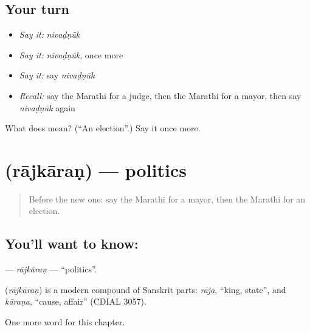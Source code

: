 \subsection*{Your turn}
\begin{itemize}
\raggedright
  \item \emph{Say it:} \emph{nivaḍṇūk}
  \item \emph{Say it:} \emph{nivaḍṇūk}, once more
  \item \emph{Say it:} say \emph{nivaḍṇūk}
  \item \emph{Recall:} say the Marathi for a judge, then the Marathi for a mayor, then say \emph{nivaḍṇūk} again
\end{itemize}

\begin{tcolorbox}[breakable,colback=teal!4,colframe=teal!35!black,title={Before you move on}]
What does  mean? (\textquotedblleft{}An election\textquotedblright{}.) Say it once more.
\end{tcolorbox}
\section[\texorpdfstring{\mr{राजकारण} (rājkāraṇ)}{राजकारण (rājkāraṇ)}]{ (rājkāraṇ) — politics}

\label{lesson:MR-C179-rajkaran}



\begin{quote}
Before the new one: say the Marathi for a mayor, then the Marathi for an election.
\end{quote}

\subsection*{You'll want to know: }
\textbf{} — \emph{rājkāraṇ} — \textquotedblleft{}politics\textquotedblright{}.

\begin{cousinweb}
\textbf{} (\emph{rājkāraṇ}) is a modern compound of Sanskrit parts: \emph{rāja}, \textquotedblleft{}king, state\textquotedblright{}, and \emph{kāraṇa}, \textquotedblleft{}cause, affair\textquotedblright{} (CDIAL 3057).
\end{cousinweb}

\begin{grammarlens}[title={What you've built}]
One more word for this chapter.
\end{grammarlens}

